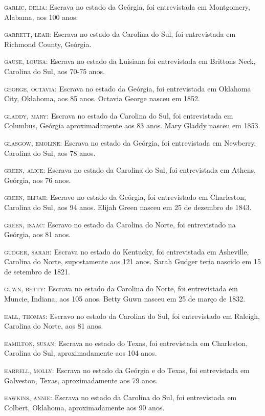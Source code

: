 \begin{Parskip}
\textsc{garlic, delia:} Escrava no estado da Geórgia, foi entrevistada
em Montgomery, Alabama, aos 100 anos.

\textsc{garrett, leah:} Escrava no estado da Carolina do Sul, foi
entrevistada em Richmond County, Geórgia.

\textsc{gause, louisa:} Escrava no estado da Luisiana foi entrevistada
em Brittons Neck, Carolina do Sul, aos 70-75 anos.

\textsc{george, octavia:} Escrava no estado da Geórgia, foi entrevistada
em Oklahoma City, Oklahoma, aos 85 anos. Octavia George nasceu em 1852.

\textsc{gladdy, mary:} Escrava no estado da Carolina do Sul, foi
entrevistada em Columbus, Geórgia aproximadamente aos 83 anos. Mary
Gladdy nasceu em 1853.

\textsc{glasgow, emoline:} Escrava no estado da Geórgia, foi
entrevistada em Newberry, Carolina do Sul, aos 78 anos.

\textsc{green, alice:} Escrava no estado da Carolina do Sul, foi
entrevistada em Athens, Geórgia, aos 76 anos.

\textsc{green, elijah:} Escravo no estado da Geórgia, foi entrevistado
em Charleston, Carolina do Sul, aos 94 anos. Elijah Green nasceu em 25
de dezembro de 1843.

\textsc{green, isaac:} Escravo no estado da Carolina do Norte, foi
entrevistado na Geórgia, aos 81 anos.

\textsc{gudger, sarah:} Escrava no estado do Kentucky, foi entrevistada
em Asheville, Carolina do Norte, supostamente aos 121 anos. Sarah Gudger
teria nascido em 15 de setembro de 1821.

\textsc{guwn, betty:} Escrava no estado da Carolina do Norte, foi
entrevistada em Muncie, Indiana, aos 105 anos. Betty Guwn nasceu em 25
de março de 1832.

\textsc{hall, thomas:} Escravo no estado da Carolina do Sul, foi
entrevistado em Raleigh, Carolina do Norte, aos 81 anos.

\textsc{hamilton, susan:} Escrava no estado do Texas, foi entrevistada
em Charleston, Carolina do Sul, aproximadamente aos 104 anos.

\textsc{harrell, molly:} Escrava no estado da Geórgia e do Texas, foi
entrevistada em Galveston, Texas, aproximadamente aos 79 anos.

\textsc{hawkins, annie:} Escrava no estado da Carolina do Sul, foi
entrevistada em Colbert, Oklahoma, aproximadamente aos 90 anos.


\end{Parskip}
